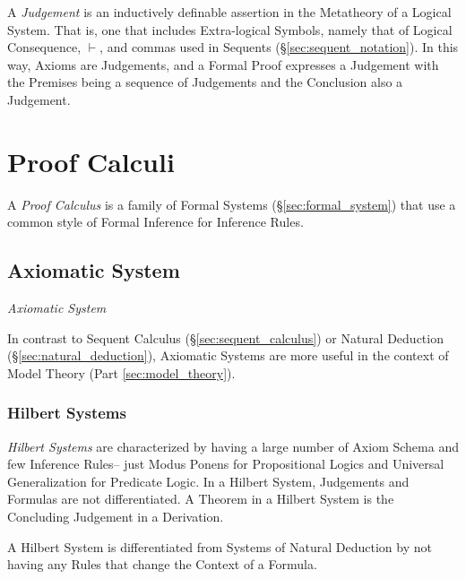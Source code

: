 A \emph{Judgement} is an inductively definable assertion in the
Metatheory of a Logical System. That is, one that includes
Extra-logical Symbols, namely that of Logical Consequence, $\vdash$,
and commas used in Sequents (\S\ref{sec:sequent_notation}). In this
way, Axioms are Judgements, and a Formal Proof expresses a Judgement
with the Premises being a sequence of Judgements and the Conclusion
also a Judgement.



\section{Proof Calculi}\label{sec:proof_calculus}

A \emph{Proof Calculus} is a family of Formal Systems
(\S\ref{sec:formal_system}) that use a common style of Formal
Inference for Inference Rules.



\subsection{Axiomatic System} \label{sec:axiomatic_system}

\emph{Axiomatic System}

In contrast to Sequent Calculus (\S\ref{sec:sequent_calculus}) or
Natural Deduction (\S\ref{sec:natural_deduction}), Axiomatic Systems
are more useful in the context of Model Theory (Part
\ref{sec:model_theory}).



\subsubsection{Hilbert Systems}\label{sec:hilbert_systems}

\emph{Hilbert Systems} are characterized by having a large number of
Axiom Schema and few Inference Rules-- just Modus Ponens for
Propositional Logics and Universal Generalization for Predicate
Logic. In a Hilbert System, Judgements and Formulas are not
differentiated. A Theorem in a Hilbert System is the Concluding
Judgement in a Derivation.

A Hilbert System is differentiated from Systems of Natural Deduction
by not having any Rules that change the Context of a Formula.




